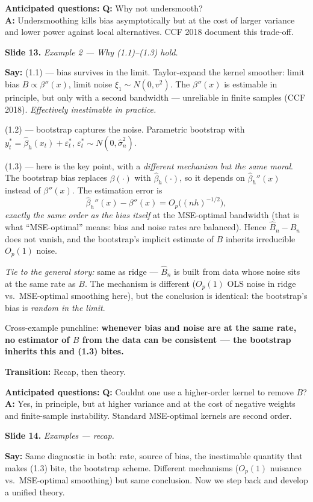 \documentclass[11pt]{article}
\theoremstyle{definition}
\newcommand{\Bn}{B_{n}}
\newcommand{\Bnh}{\hat{B}_{n}}
\newcommand{\slide}[2]{%
  \medskip
  \noindent\colorbox{soft}{\parbox{\linewidth}{\textbf{Slide #1.} \textit{#2}}}
  \medskip
}
\newcommand{\say}[1]{\textbf{Say:} #1}
\newcommand{\trans}[1]{\textbf{Transition:} #1}
\newcommand{\Q}[2]{\noindent\textcolor{warn}{\textbf{Q:}} #1\\ \textcolor{accent}{\textbf{A:}} #2\par\smallskip}
\begin{document}
\textbf{Anticipated questions:}
\Q{Why not undersmooth?}
{Undersmoothing kills bias asymptotically but at the cost of larger variance
and lower power against local alternatives. CCF 2018 document this trade-off.}

\slide{13}{Example 2 --- Why (1.1)--(1.3) hold.}
\say{(1.1) --- bias survives in the limit. Taylor-expand the kernel smoother:
limit bias $B \propto \beta''(x)$, limit noise $\xi_1\sim N(0,v^2)$. The
$\beta''(x)$ is estimable in principle, but only with a second bandwidth ---
unreliable in finite samples (CCF 2018). \emph{Effectively inestimable in
practice.}

(1.2) --- bootstrap captures the noise. Parametric bootstrap with
$y_t^*=\hat\beta_h(x_t)+\varepsilon_t^*$, $\varepsilon_t^*\sim N(0,\hat\sigma_n^2)$.

(1.3) --- here is the key point, with a \emph{different mechanism but the same
moral}. The bootstrap bias replaces $\beta(\cdot)$ with $\hat\beta_h(\cdot)$,
so it depends on $\hat\beta_h''(x)$ instead of $\beta''(x)$. The estimation
error is
\[
  \hat\beta_h''(x)-\beta''(x) = O_p\bigl((nh)^{-1/2}\bigr),
\]
\emph{exactly the same order as the bias itself} at the MSE-optimal bandwidth
(that is what ``MSE-optimal'' means: bias and noise rates are balanced).
Hence $\Bnh-\Bn$ does not vanish, and the bootstrap's implicit estimate of
$B$ inherits irreducible $O_p(1)$ noise.

\emph{Tie to the general story:} same as ridge --- $\Bnh$ is built from data
whose noise sits at the same rate as $B$. The mechanism is different ($O_p(1)$
OLS noise in ridge vs.\ MSE-optimal smoothing here), but the conclusion is
identical: the bootstrap's bias is \emph{random in the limit}.

Cross-example punchline: \textbf{whenever bias and noise are at the same
rate, no estimator of $B$ from the data can be consistent --- the bootstrap
inherits this and (1.3) bites.}}

\trans{Recap, then theory.}

\textbf{Anticipated questions:}
\Q{Couldnt one use a higher-order kernel to remove $B$?}
{Yes, in principle, but at higher variance and at the cost of negative weights
and finite-sample instability. Standard MSE-optimal kernels are second order.}

\slide{14}{Examples --- recap.}
\say{Same diagnostic in both: rate, source of bias, the inestimable
quantity that makes (1.3) bite, the bootstrap scheme. Different mechanisms
($O_p(1)$ nuisance vs.\ MSE-optimal smoothing) but same conclusion. Now we
step back and develop a unified theory.}
\end{document}
